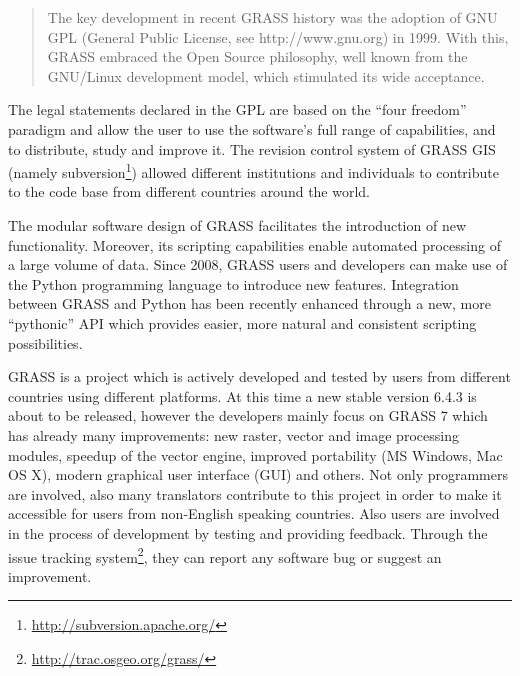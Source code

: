\documentclass[a4paper,12pt,oneside]{book}
\begin{document}
\begin{quote}
The key development in recent GRASS history was the adoption of GNU GPL
(General Public License, see http://www.gnu.org) in 1999.
With this, GRASS embraced the Open Source philosophy,
well known from the GNU/Linux development model, which stimulated its wide acceptance.
\end{quote}

The legal statements declared in the GPL are based on the ``four freedom'' paradigm \cite{stallman1985gnu}
and allow the user to use the software’s full range of capabilities, and to distribute, study and improve it.
The revision control system of GRASS GIS (namely subversion\footnote{\url{http://subversion.apache.org/}})
allowed different institutions and individuals to contribute to the code base
from different countries around the world.

The modular software design of GRASS facilitates the introduction of new functionality.
Moreover, its scripting capabilities enable automated processing of a large volume of data.
Since 2008, GRASS users and developers can make use of the Python programming language \cite{van1995python}
to introduce new features. Integration between GRASS and Python has been recently enhanced through a new,
more ``pythonic'' API \cite{pygrass} which provides easier, more natural and consistent scripting possibilities.

GRASS is a project which is actively developed and tested by users from different
countries using different platforms.
At this time a new stable version 6.4.3 is about to be released, however
the developers mainly focus on GRASS 7 which has already many improvements:
new raster, vector and image processing modules, speedup of the vector engine,
improved portability (MS Windows, Mac OS X), modern graphical user interface (GUI) and others.
Not only programmers are involved, also many translators contribute to this project
in order to make it accessible for users from non-English speaking countries.
Also users are involved in the process of development by testing and providing feedback.
Through the issue tracking system\footnote{\url{http://trac.osgeo.org/grass/}},
they can report any software bug or suggest an improvement.

\end{document}
